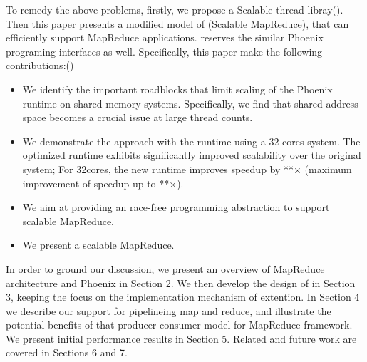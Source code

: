 To remedy the above problems, 
firstly, we propose a Scalable thread libray(\myth).
Then this paper presents a modified model of \myds(Scalable MapReduce), 
that can efficiently support MapReduce applications.
\myds reserves the similar Phoenix programing interfaces as well.
Specifically, this paper make the following contributions:()
\begin{itemize}
  \item We identify the important roadblocks 
  that limit scaling of the Phoenix runtime on shared-memory systems. 
  Specifically, we find that shared address space
   becomes a crucial issue at large thread counts.

  \item We demonstrate the approach with the \myds runtime using a 32-cores system. The optimized runtime exhibits significantly improved scalability over the
original system; For 32cores, the new runtime improves speedup by **× 
(maximum improvement of speedup up to **×).

  \item We aim at providing an race-free programming abstraction to
support scalable MapReduce.
  \item We present a scalable MapReduce.
\end{itemize}

In order to ground our discussion, we present an overview
of MapReduce architecture and Phoenix in Section 2. 
We then develop the design of \myth in Section 3, 
keeping the focus on the implementation mechanism of extention. 
In Section 4 we describe our support for pipelineing map and reduce,
and illustrate the potential benefits of that producer-consumer model for MapReduce framework. 
We present initial performance results in Section 5. 
Related and future work are covered in Sections 6 and 7.

